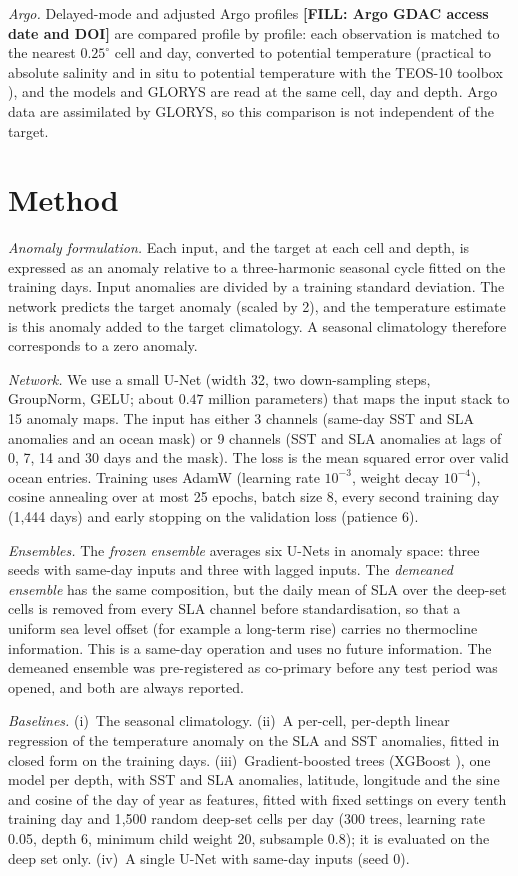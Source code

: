 \emph{Argo.} Delayed-mode and adjusted Argo profiles \textbf{[FILL: Argo GDAC access date and DOI]} are compared profile by profile: each observation is matched to the nearest $0.25^\circ$ cell and day, converted to potential temperature (practical to absolute salinity and in situ to potential temperature with the TEOS-10 toolbox \cite{teos10}), and the models and GLORYS are read at the same cell, day and depth. Argo data are assimilated by GLORYS, so this comparison is not independent of the target.

\section{Method}
\label{sec:method}
\emph{Anomaly formulation.} Each input, and the target at each cell and depth, is expressed as an anomaly relative to a three-harmonic seasonal cycle fitted on the training days. Input anomalies are divided by a training standard deviation. The network predicts the target anomaly (scaled by 2), and the temperature estimate is this anomaly added to the target climatology. A seasonal climatology therefore corresponds to a zero anomaly.

\emph{Network.} We use a small U-Net \cite{unet} (width 32, two down-sampling steps, GroupNorm, GELU; about $0.47$ million parameters) that maps the input stack to 15 anomaly maps. The input has either 3 channels (same-day SST and SLA anomalies and an ocean mask) or 9 channels (SST and SLA anomalies at lags of 0, 7, 14 and 30 days and the mask). The loss is the mean squared error over valid ocean entries. Training uses AdamW (learning rate $10^{-3}$, weight decay $10^{-4}$), cosine annealing over at most 25 epochs, batch size 8, every second training day (1{,}444 days) and early stopping on the validation loss (patience 6).

\emph{Ensembles.} The \emph{frozen ensemble} averages six U-Nets in anomaly space: three seeds with same-day inputs and three with lagged inputs. The \emph{demeaned ensemble} has the same composition, but the daily mean of SLA over the deep-set cells is removed from every SLA channel before standardisation, so that a uniform sea level offset (for example a long-term rise) carries no thermocline information. This is a same-day operation and uses no future information. The demeaned ensemble was pre-registered as co-primary before any test period was opened, and both are always reported.

\emph{Baselines.} (i)~The seasonal climatology. (ii)~A per-cell, per-depth linear regression of the temperature anomaly on the SLA and SST anomalies, fitted in closed form on the training days. (iii)~Gradient-boosted trees (XGBoost \cite{xgboost}), one model per depth, with SST and SLA anomalies, latitude, longitude and the sine and cosine of the day of year as features, fitted with fixed settings on every tenth training day and 1{,}500 random deep-set cells per day (300 trees, learning rate 0.05, depth 6, minimum child weight 20, subsample 0.8); it is evaluated on the deep set only. (iv)~A single U-Net with same-day inputs (seed 0).

